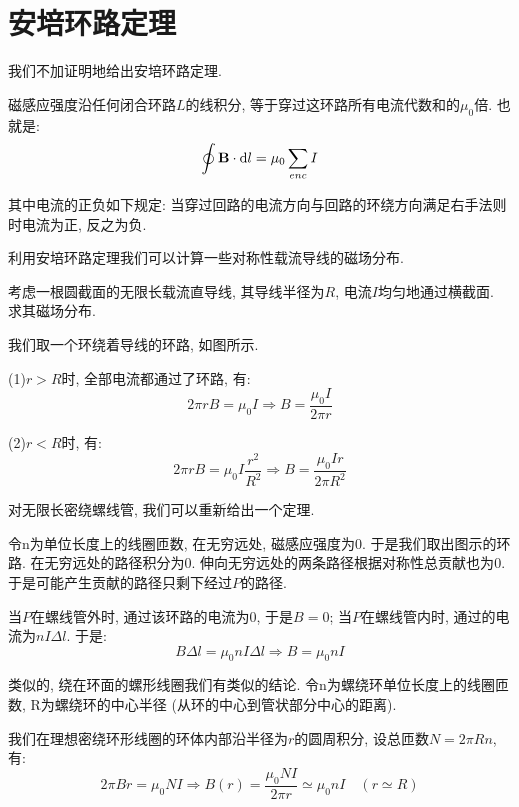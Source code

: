 \section{安培环路定理}

我们不加证明地给出安培环路定理.
\begin{theorem}[安培环路定理]

磁感应强度沿任何闭合环路$L$的线积分, 等于穿过这环路所有电流代数和的$\mu_0$倍. 也就是:
\[
\oint \mathbf{B} \cdot \mathop{}\!\mathrm{d} l = \mu_0 \sum_{enc} I
\]

\end{theorem}

其中电流的正负如下规定: 当穿过回路的电流方向与回路的环绕方向满足右手法则时电流为正, 反之为负.

利用安培环路定理我们可以计算一些对称性载流导线的磁场分布.

\begin{example}
考虑一根圆截面的无限长载流直导线, 其导线半径为$R$, 电流$I$均匀地通过横截面. 求其磁场分布.

我们取一个环绕着导线的环路, 如图所示.

(1)$r>R$时, 全部电流都通过了环路, 有:
\[
2\pi r B = \mu_0 I\Rightarrow B = \frac{\mu_0 I}{2\pi r}
\]

(2)$r<R$时, 有:
\[
2\pi r B = \mu_0 I \frac{r^2}{R^2} \Rightarrow B = \frac{\mu_0 Ir}{2\pi R^2}
\]
\end{example}

\begin{example}
对无限长密绕螺线管, 我们可以重新给出一个定理.

令n为单位长度上的线圈匝数, 在无穷远处, 磁感应强度为$0$. 于是我们取出图示的环路. 在无穷远处的路径积分为$0$. 伸向无穷远处的两条路径根据对称性总贡献也为$0$. 于是可能产生贡献的路径只剩下经过$P$的路径.

当$P$在螺线管外时, 通过该环路的电流为0, 于是$B=0$; 当$P$在螺线管内时, 通过的电流为$nI\Delta l$. 于是:
\[
B \Delta l = \mu_0 n I \Delta l \Rightarrow B = \mu_0 nI
\]

类似的, 绕在环面的螺形线圈我们有类似的结论. 令n为螺绕环单位长度上的线圈匝数, R为螺绕环的中心半径 (从环的中心到管状部分中心的距离).


我们在理想密绕环形线圈的环体内部沿半径为$r$的圆周积分, 设总匝数$N=2\pi Rn$, 有:\[
2\pi Br =\mu_0 NI \Rightarrow B(r) = \frac{\mu_0 NI}{2\pi r}\simeq\mu_0nI\quad(r\simeq R)
\]

\end{example}

